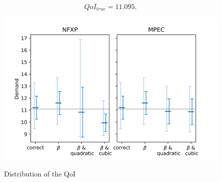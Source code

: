 \begin{equation*}
	QoI_{true} = 11.095.
\end{equation*}

\begin{figure}[!b]
	\caption{Distribution of the QoI}
	\vspace*{-4mm}
	\centering
	\includegraphics[scale=0.9]{../figures/figure_6.png}
	\label{figure6}
\end{figure}

